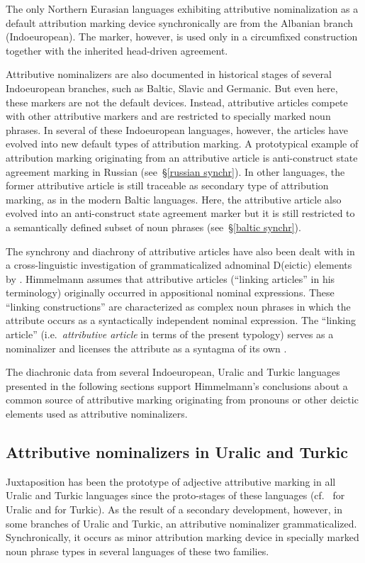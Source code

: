 The only Northern Eurasian languages exhibiting attributive nominalization as a default attribution marking device synchronically are from the Albanian branch (Indoeuropean). The marker, however,  is used only in a circumfixed construction together with the inherited head-driven agreement.

Attributive nominalizers are also documented in historical stages of several Indoeuropean branches, such as Baltic, Slavic and Germanic. But even here, these markers are not the default devices. Instead, attributive articles compete with other attributive markers and are restricted to specially marked noun phrases. In several of these Indoeuropean languages, however, the articles have evolved into new default types of attribution marking. A prototypical example of attribution marking originating from an attributive article is anti-construct state agreement marking in Russian (see~\S\ref{russian synchr}). In other languages, the former attributive article is still traceable as secondary type of attribution marking, as in the modern Baltic languages. Here, the attributive article also evolved into an anti-construct state agreement marker but it is still restricted to a semantically defined subset of noun phrases (see~\S\ref{baltic synchr}). 

The synchrony and diachrony of attributive articles have also been dealt with in a cross-linguistic investigation of grammaticalized adnominal D(eictic) elements by \cite{himmelmann1997}. Himmelmann assumes that attributive articles (“linking articles” in his terminology) originally occurred in appositional nominal expressions. These “linking constructions” are characterized as complex noun phrases in which the attribute occurs as a syntactically independent nominal expression. The “linking article” (i.e.~\textit{attributive article} in terms of the present typology) serves as a nominalizer and licenses the attribute as a syntagma of its own \cite[188]{himmelmann1997}.

The diachronic data from several Indoeuropean, Uralic and Turkic languages presented in the following sections support Himmelmann's conclusions about a common source of attributive marking originating from pronouns or other deictic elements used as attributive nominalizers.

\subsection{Attributive nominalizers in Uralic and Turkic}\label{uralic-turkic diachr}
Juxtaposition has been the prototype of adjective attributive marking in all Uralic and Turkic languages since the proto-stages of these languages (cf.~\citealt[80–81]{decsy1990} for Uralic and \citealt[75–76]{decsy1998} for Turkic). As the result of a secondary development, however, in some branches of Uralic and Turkic, an attributive nominalizer grammaticalized. Synchronically, it occurs as minor attribution marking device in specially marked noun phrase types in several languages of these two families.%

